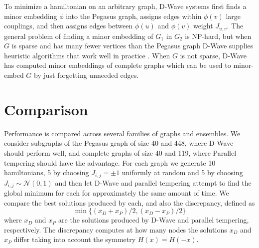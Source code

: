 \documentclass[12pt]{article}
\newcommand{\1}{\mathbf{1}}
\theoremstyle{remark}
\theoremstyle{definition}
\theoremstyle{proposition}
\theoremstyle{lemma}
\theoremstyle{definition}
\begin{document}
	To minimize a hamiltonian on an arbitrary graph, D-Wave systems first finds a minor embedding $\phi$ into the Pegasus graph, assigns edges within $\phi(v)$ large couplings, and then assigns edges between $\phi(u)$ and $\phi(v)$ weight $J_{u, v}$. The general problem of finding a minor embedding of $G_1$ in $G_2$ is NP-hard, but when $G$ is sparse and has many fewer vertices than the Pegasus graph D-Wave supplies heuristic algorithms that work well in practice \cite{cai2014practical}. When $G$ is not sparse, D-Wave has computed minor embeddings of complete graphs which can be used to minor-embed $G$ by just forgetting unneeded edges.
	
	\section{Comparison}
	\indent \indent Performance is compared across several families of graphs and ensembles. We consider subgraphs of the Pegasus graph of size 40 and 448, where D-Wave should perform well, and complete graphs of size 40 and 119, where Parallel tempering should have the advantage. For each graph we generate 10 hamiltonians, 5 by choosing $J_{i, j} = \pm 1$ uniformly at random and 5 by choosing $J_{i, j} \sim \mathcal{N}(0, 1)$ and then let D-Wave and parallel tempering attempt to find the global minimum for each for approximately the same amount of time. We compare the best solutions produced by each, and also the discrepancy, defined as 
	$$\min \{(x_D + x_P)/2, (x_D - x_P)/2\}$$
	where $x_D$ and $x_P$  are the solutions produced by D-Wave and parallel tempering, respectively. The discrepancy computes at how many nodes the solutions $x_D$ and $x_P$ differ taking into account the symmetry $H(x) = H(-x)$.
	
	
	 
	
	
	
\end{document}
